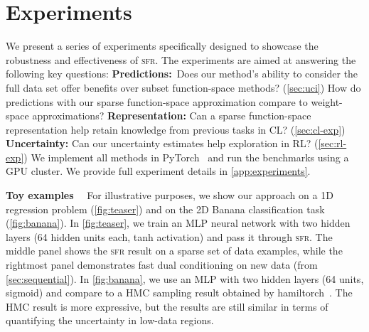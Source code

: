 \documentclass{article}
\renewcommand{\paragraph}[1]{{\bf #1}~~}
\newcommand{\our}{\textsc{sfr}\xspace}
\begin{document}
\section{Experiments}
\label{sec:experiments}
%
We present a series of experiments specifically designed to showcase the robustness and effectiveness of \our. The experiments are aimed at answering the following key questions:
\textbf{Predictions:}~Does our method's ability to consider the full data set offer benefits over subset function-space methods? (\cref{sec:uci}) How do predictions with our sparse function-space approximation compare to weight-space approximations? 
\textbf{Representation:} Can a sparse function-space representation help retain knowledge from previous tasks in CL? (\cref{sec:cl-exp})
\textbf{Uncertainty:} Can our uncertainty estimates help exploration in RL? (\cref{sec:rl-exp}) We implement all methods in PyTorch~\cite{paszke2019pytorch} and run the benchmarks using a GPU cluster. We provide full experiment details in \cref{app:experiments}. 

\paragraph{Toy examples} For illustrative purposes, we show our approach on a 1D regression problem (\cref{fig:teaser}) and on the 2D {\sc Banana} classification task (\cref{fig:banana}). In \cref{fig:teaser}, we train an MLP neural network with two hidden layers (64 hidden units each, tanh activation) and pass it through \our. The middle panel shows the \our result on a sparse set of data examples, while the rightmost panel demonstrates fast dual conditioning on new data (from \cref{sec:sequential}). In \cref{fig:banana}, we use an MLP with two hidden layers (64 units, sigmoid) and compare to a HMC sampling result obtained by hamiltorch~\cite{cobb2020scaling}. The HMC result is more expressive, but the results are still similar in terms of quantifying the uncertainty in low-data regions.


\end{document}

